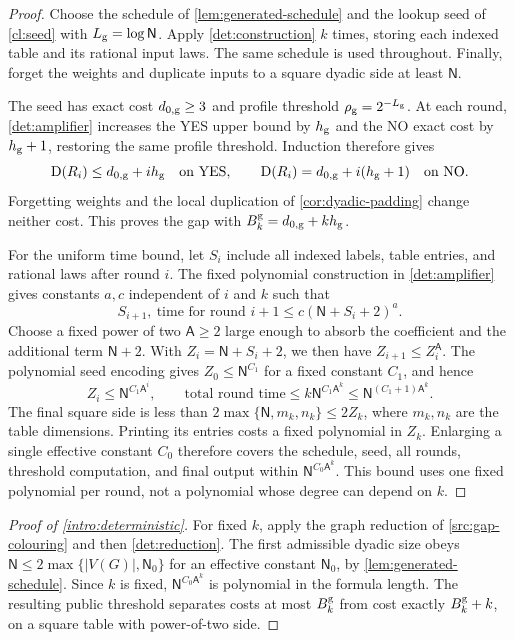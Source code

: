 \documentclass[11pt]{article} \usepackage[utf8]{inputenc}
\theoremstyle{plain} \newtheorem{theorem}{Theorem}[section]
\theoremstyle{definition} \newaliascnt{definition}{theorem}
\newcommand{\D}{\operatorname{D}}
\begin{document}
\begin{proof}
Choose the schedule of \cref{lem:generated-schedule} and the lookup seed of
\cref{cl:seed} with $L_{\rm g}=\log\mathsf N$. Apply
\cref{det:construction} $k$ times, storing each indexed table and its rational
input laws. The same schedule is used throughout. Finally, forget the weights
and duplicate inputs to a square dyadic side at least $\mathsf N$.

The seed has exact cost $d_{0,\rm g}\ge3$ and profile threshold
$\rho_{\rm g}=2^{-L_{\rm g}}$. At each round, \cref{det:amplifier} increases
the YES upper bound by $h_{\rm g}$ and the NO exact cost by $h_{\rm g}+1$,
restoring the same profile threshold. Induction therefore gives
\[
\D(R_i)\le d_{0,\rm g}+ih_{\rm g}\quad\text{on YES},\qquad
\D(R_i)=d_{0,\rm g}+i(h_{\rm g}+1)\quad\text{on NO}.
\]
Forgetting weights and the local duplication of \cref{cor:dyadic-padding}
change neither cost. This proves the gap with
$B_k^{\rm g}=d_{0,\rm g}+kh_{\rm g}$.

For the uniform time bound, let $S_i$ include all indexed labels, table entries,
and rational laws after round $i$. The fixed polynomial construction in
\cref{det:amplifier} gives constants $a,c$ independent of $i$ and $k$ such that
\[
S_{i+1},\ \text{time for round }i+1\le c(\mathsf N+S_i+2)^a.
\]
Choose a fixed power of two $\mathsf A\ge2$ large enough to absorb the
coefficient and the additional term $\mathsf N+2$. With
$Z_i=\mathsf N+S_i+2$, we then have $Z_{i+1}\le Z_i^{\mathsf A}$.
The polynomial seed encoding gives $Z_0\le\mathsf N^{C_1}$ for a fixed
constant $C_1$, and hence
\[
Z_i\le\mathsf N^{C_1\mathsf A^i},\qquad
\text{total round time}\le k\mathsf N^{C_1\mathsf A^k}
\le\mathsf N^{(C_1+1)\mathsf A^k}.
\]
The final square side is less than $2\max\{\mathsf N,m_k,n_k\}\le2Z_k$,
where $m_k,n_k$ are the table dimensions. Printing its entries costs a fixed
polynomial in $Z_k$. Enlarging a single effective constant $C_0$ therefore
covers the schedule, seed, all rounds, threshold computation, and final output
within $\mathsf N^{C_0\mathsf A^k}$. This bound uses one fixed polynomial
per round, not a polynomial whose degree can depend on $k$.
\end{proof}

\begin{proof}[Proof of \cref{intro:deterministic}]
For fixed $k$, apply the graph reduction of \cref{src:gap-colouring} and then
\cref{det:reduction}. The first admissible dyadic size obeys
$\mathsf N\le2\max\{|V(G)|,\mathsf N_0\}$ for an effective constant
$\mathsf N_0$, by \cref{lem:generated-schedule}. Since $k$ is fixed,
$\mathsf N^{C_0\mathsf A^k}$ is polynomial in the formula length.
The resulting public threshold separates costs at most $B_k^{\rm g}$ from
cost exactly $B_k^{\rm g}+k$, on a square table with power-of-two side.
\end{proof}
\end{document}
